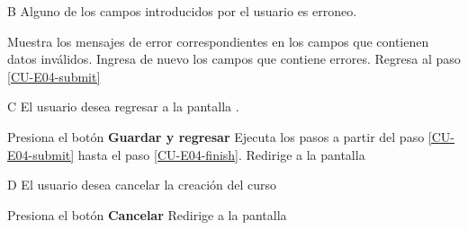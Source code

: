 \begin{UCtrayectoriaA}{B}{%
Alguno de los campos introducidos por el usuario es erroneo.
}

  \Sistema Muestra los mensajes de error correspondientes en los campos que
           contienen datos inválidos.
  \Actor Ingresa de nuevo los campos que contiene errores.
  \Sistema Regresa al paso \ref{CU-E04-submit}

\end{UCtrayectoriaA}

\begin{UCtrayectoriaA}{C}{%
El usuario desea regresar a la pantalla .
}

  \Actor Presiona el botón {\bf Guardar y regresar}
  \Sistema Ejecuta los pasos a partir del paso \ref{CU-E04-submit} hasta el
           paso \ref{CU-E04-finish}.
  \Sistema Redirige a la pantalla 

\end{UCtrayectoriaA}

\begin{UCtrayectoriaA}{D}{%
El usuario desea cancelar la creación del curso
}

  \Actor Presiona el botón {\bf Cancelar}
  \Sistema Redirige a la pantalla 

\end{UCtrayectoriaA}
